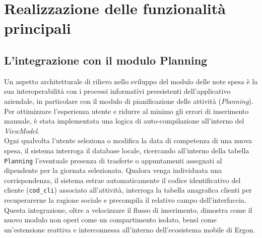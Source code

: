 \section{Realizzazione delle funzionalità principali}
\label{sec:sviluppo-principali}

\subsection*{L'integrazione con il modulo Planning}
\noindent Un aspetto architetturale di rilievo nello sviluppo del modulo delle note spesa è la sua interoperabilità con i processi informativi preesistenti dell'applicativo aziendale, in particolare con il modulo di pianificazione delle attività (\textit{Planning}). Per ottimizzare l'esperienza utente e ridurre al minimo gli errori di inserimento manuale, è stata implementata una logica di auto-compilazione all'interno del \textit{ViewModel}.\\
Ogni qualvolta l'utente seleziona o modifica la data di competenza di una nuova spesa, il sistema interroga il database locale, ricercando all'interno della tabella \texttt{Planning} l'eventuale presenza di trasferte o appuntamenti assegnati al dipendente per la giornata selezionata. Qualora venga individuata una corrispondenza, il sistema estrae automaticamente il codice identificativo del cliente (\texttt{cod\_cli}) associato all'attività, interroga la tabella anagrafica clienti per recuperarerne la ragione sociale e precompila il relativo campo dell'interfaccia.\\
Questa integrazione, oltre a velocizzare il flusso di inserimento, dimostra come il nuovo modulo non operi come un compartimento isolato, bensì come un'estensione reattiva e interconnessa all'interno dell'ecosistema mobile di Ergon.



